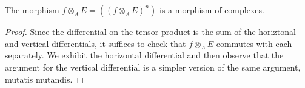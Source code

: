 \documentclass[dissertation.tex]{subfiles}
\begin{document}
\begin{lem}
  The morphism $f \otimes_A E = \left(\left(f \otimes_A E\right)^n\right)$ is a morphism of complexes.
  
  \begin{proof}
    Since the differential on the tensor product is the sum of the horiztonal and vertical differentials, it suffices to check that $f \otimes_A E$ commutes with each separately.
    We exhibit the horizontal differential and then observe that the argument for the vertical differential is a simpler version of the same argument, mutatis mutandis.
    

\end{proof}
\end{lem}
\end{document}
